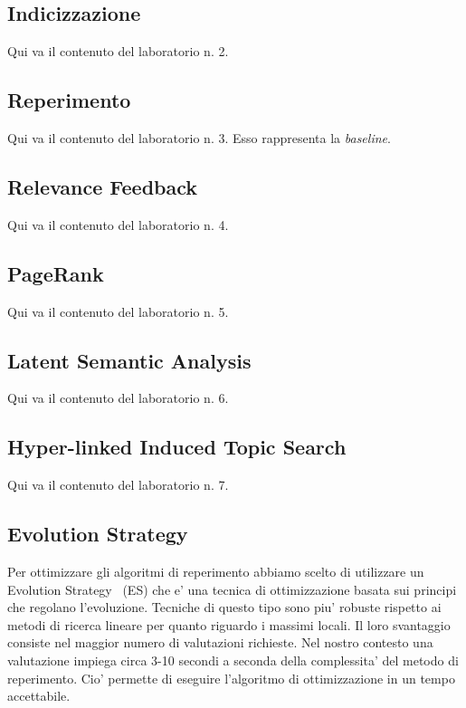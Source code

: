 \subsection{Indicizzazione} \label{sec:metodi-di-indic}

Qui va il contenuto del laboratorio n. 2.

\subsection{Reperimento}
\label{sec:metodi-di-reper}

Qui va il contenuto del laboratorio n. 3. Esso rappresenta la \textit{baseline}.

\subsection{Relevance Feedback}
\label{sec:relevance-feedback}

Qui va il contenuto del laboratorio n. 4.

\subsection{PageRank}
\label{sec:pagerank}

Qui va il contenuto del laboratorio n. 5.

\subsection{Latent Semantic Analysis}
\label{sec:lsa}

Qui va il contenuto del laboratorio n. 6.

\subsection{Hyper-linked Induced Topic Search}
\label{sec:hits}

Qui va il contenuto del laboratorio n. 7.

\subsection{Evolution Strategy}
\label{sec:es}

Per ottimizzare gli algoritmi di reperimento abbiamo scelto di utilizzare un Evolution Strategy~\cite{back1996evolutionary} (ES) che e' una tecnica di ottimizzazione basata sui principi che regolano l'evoluzione. Tecniche di questo tipo sono piu' robuste rispetto ai metodi di ricerca lineare per quanto riguardo i massimi locali. Il loro svantaggio consiste nel maggior numero di valutazioni richieste. Nel nostro contesto una valutazione impiega circa 3-10 secondi a seconda della complessita' del metodo di reperimento. Cio' permette di eseguire l'algoritmo di ottimizzazione in un tempo accettabile.

